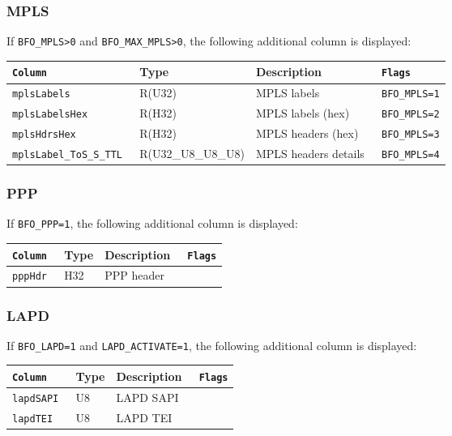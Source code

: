 \documentclass[documentation]{subfiles}
\begin{document}
\subsubsection{MPLS}\label{s:bfo:mpls}

If {\tt BFO\_MPLS>0} and {\tt BFO\_MAX\_MPLS>0}, the following additional column is displayed:

\begin{longtable}{>{\tt}lll>{\tt\small}l}
    \toprule
    {\bf Column}           & {\bf Type}         & {\bf Description}    & {\bf Flags}\\
    \midrule\endhead%
    mplsLabels             & R(U32)             & MPLS labels          & BFO\_MPLS=1\\
    mplsLabelsHex          & R(H32)             & MPLS labels (hex)    & BFO\_MPLS=2\\
    mplsHdrsHex            & R(H32)             & MPLS headers (hex)   & BFO\_MPLS=3\\
    mplsLabel\_ToS\_S\_TTL & R(U32\_U8\_U8\_U8) & MPLS headers details & BFO\_MPLS=4\\
    \bottomrule
\end{longtable}

\subsubsection{PPP}\label{s:bfo:ppp}

If {\tt BFO\_PPP=1}, the following additional column is displayed:

\begin{longtable}{>{\tt}lll>{\tt\small}l}
    \toprule
    {\bf Column} & {\bf Type} & {\bf Description} & {\bf Flags}\\
    \midrule\endhead%
    pppHdr       & H32        & PPP header        & \\
    \bottomrule
\end{longtable}

\subsubsection{LAPD}\label{s:bfo:lapd}

If {\tt BFO\_LAPD=1} and {\tt LAPD\_ACTIVATE=1}, the following additional column is displayed:

\begin{longtable}{>{\tt}lll>{\tt\small}l}
    \toprule
    {\bf Column} & {\bf Type} & {\bf Description} & {\bf Flags}\\
    \midrule\endhead%
    lapdSAPI     & U8         & LAPD SAPI         & \\
    lapdTEI      & U8         & LAPD TEI          & \\
    \bottomrule
\end{longtable}
\end{document}
